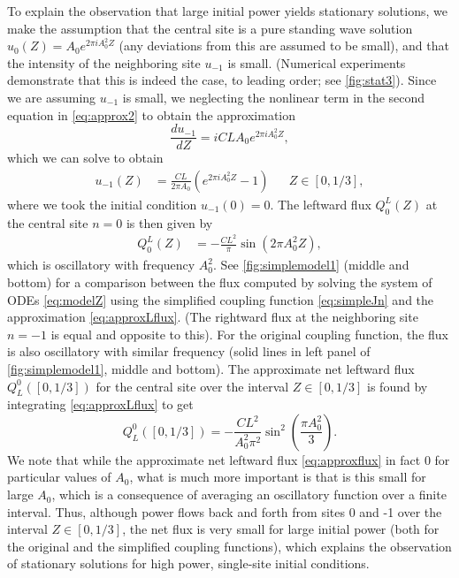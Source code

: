 \documentclass[reprint, amsmath,amssymb,aps,pre]{revtex4-2}
\begin{document}
To explain the observation that large initial power yields stationary solutions, 
we make the assumption that the central site is a pure standing wave solution $u_0(Z) = A_0 e^{2 \pi i A_0^2 Z}$ (any deviations from this are assumed to be small), and that the intensity of the neighboring site $u_{-1}$ is small. (Numerical experiments demonstrate that this is indeed the case, to leading order; see \cref{fig:stat3}). Since we are assuming $u_{-1}$ is small, we neglecting the nonlinear term in the second equation in \cref{eq:approx2} to obtain the approximation
\begin{equation}
\frac{d u_{-1}}{d Z} = i C L A_0 e^{2 \pi i A_0^2 Z},
\end{equation}
which we can solve to obtain
\begin{align}
u_{-1}(Z) &= \frac{CL}{2\pi A_0}\left( e^{2\pi i A_0^2 Z} - 1\right) 
&& Z \in [0,1/3],
\end{align}
where we took the initial condition $u_{-1}(0) = 0$.
The leftward flux $Q_0^L(Z)$ at the central site $n=0$ is then given by
\begin{align}\label{eq:approxLflux}
Q_0^L(Z) &= -\frac{C L^2}{\pi} \sin\left(2 \pi A_0^2 Z \right),
\end{align}
which is oscillatory with frequency $A_0^2$. See \cref{fig:simplemodel1} (middle and bottom) for a comparison between the flux computed by solving the system of ODEs \cref{eq:modelZ} using the simplified coupling function \cref{eq:simpleJn} and the approximation \cref{eq:approxLflux}. (The rightward flux at the neighboring site $n=-1$ is equal and opposite to this). For the original coupling function, the flux is also oscillatory with similar frequency (solid lines in left panel of \cref{fig:simplemodel1}, middle and bottom). The approximate net leftward flux $Q_{L}^0([0,1/3])$ for the central site over the interval $Z \in [0, 1/3]$ is found by integrating \cref{eq:approxLflux} to get
\begin{equation}\label{eq:approxflux}
Q_{L}^0([0,1/3]) = -\frac{CL^2}{A_0^2\pi^2}\sin^2\left( \frac{\pi A_0^2}{3}\right).
\end{equation}
We note that while the approximate net leftward flux \cref{eq:approxflux} in fact 0 for particular values of $A_0$, what is much more important is that is this small for large $A_0$, which is a consequence of averaging an oscillatory function over a finite interval. Thus, although power flows back and forth from sites 0 and -1 over the interval $Z \in [0, 1/3]$, the net flux is very small for large initial power (both for the original and the simplified coupling functions), which explains the observation of stationary solutions for high power, single-site initial conditions.
\end{document}
